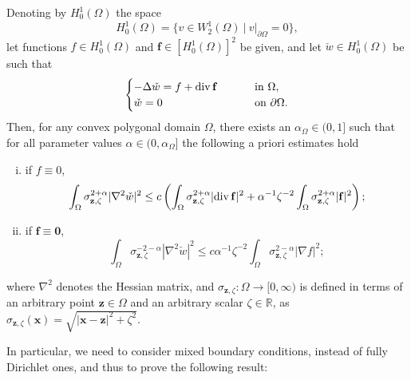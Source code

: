 \documentclass[final,hidelinks]{siamart1116Arxiv}
\numberwithin{theorem}{section}
\newcommand{\Div}{{\rm div}\,}
\newcommand{\st}{{\ | \ }} %
\begin{document}
\begin{lemma}\label{lmm:actualRSlemma}
 Denoting by $H^1_0(\Omega)$ the space
 \begin{equation}
  H^1_0(\Omega) = \{v\in W^1_2(\Omega) \st v|_{\partial\Omega}=0\},
 \end{equation}
 let functions $f\in H^1_0(\Omega)$ and $\mathbf f\in[H^1_0(\Omega)]^2$ be given, and let $\check w\in H^1_0(\Omega)$ be such that
 \begin{equation}\begin{cases}
  -\Delta \check{w} = f+\Div\mathbf f &\qquad\text{ in }\Omega, \\
  \check{w} = 0 &\qquad\text{ on }\partial\Omega.
 \end{cases}\end{equation}
 Then, for any convex polygonal domain $\Omega$, there exists an $\alpha_\Omega\in(0,1]$ such that for all parameter values $\alpha\in(0,\alpha_\Omega]$ the following a priori estimates hold 
 \begin{enumerate}[(i)]
  \item if $f\equiv0$,
    \begin{equation}
     \int_\Omega\sigma_{\mathbf z,\zeta}^{2+\alpha}|\nabla^2 \check w|^2 \leq c\left(\int_\Omega\sigma_{\mathbf z,\zeta}^{2+\alpha}|\Div\mathbf f|^2 + \alpha^{-1}\zeta^{-2}\int_\Omega\sigma_{\mathbf z,\zeta}^{2+\alpha}|\mathbf f|^2\right);
    \end{equation} \label{it:fo}
  \item if $\mathbf f\equiv\mathbf 0$,
    \begin{equation}
     \int_\Omega\sigma_{\mathbf z,\zeta}^{-2-\alpha}|\nabla^2 \check w|^2 \leq c\alpha^{-1}\zeta^{-2}\int_\Omega\sigma_{\mathbf z,\zeta}^{2-\alpha}|\nabla f|^2;
    \end{equation} \label{it:fvo}
 \end{enumerate}
 where $\nabla^2$ denotes the Hessian matrix, and $\sigma_{\mathbf z,\zeta}:\Omega\to[0,\infty)$ is defined in terms of an arbitrary point $\mathbf z\in\Omega$ and an arbitrary scalar $\zeta\in\mathbb R$, as $\sigma_{\mathbf z,\zeta}(\mathbf x) = \sqrt{|\mathbf x-\mathbf z|^2 + \zeta^2}
 $.
\end{lemma}

In particular, we need to consider mixed boundary conditions, instead of fully Dirichlet ones, and thus to prove the following result:
\end{document}
